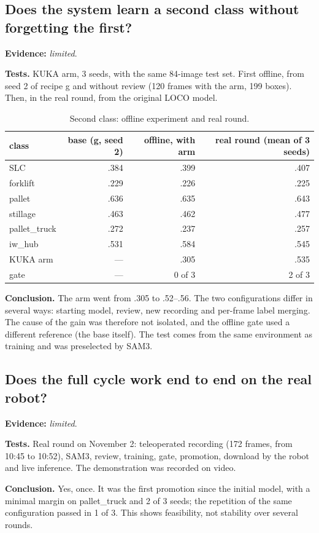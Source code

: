 \documentclass[11pt,a4paper]{article}
\newcommand{\evidence}[1]{\noindent\textbf{Evidence:} \emph{#1}.\par}
\newcommand{\tests}{\noindent\textbf{Tests.} }
\newcommand{\conclusion}{\noindent\textbf{Conclusion.} }
\begin{document}
\subsection{Does the system learn a second class without forgetting the first?}
\evidence{limited}

\tests KUKA arm, 3 seeds, with the same 84-image test set. First offline, from seed
2 of recipe g and without review (120 frames with the arm, 199 boxes). Then, in the
real round, from the original LOCO model.

\begin{table}[H]
\centering\small
\caption{Second class: offline experiment and real round.}
\begin{tabular}{lrrr}
\toprule
class & base (g, seed 2) & offline, with arm & real round (mean of 3 seeds) \\
\midrule
SLC & .384 & .399 & .407 \\
forklift & .229 & .226 & .225 \\
pallet & .636 & .635 & .643 \\
stillage & .463 & .462 & .477 \\
pallet\_truck & .272 & .237 & .257 \\
iw\_hub & .531 & .584 & .545 \\
KUKA arm & --- & .305 & .535 \\
gate & --- & 0 of 3 & 2 of 3 \\
\bottomrule
\end{tabular}
\end{table}

\conclusion The arm went from .305 to .52--.56. The two configurations differ in
several ways: starting model, review, new recording and per-frame label merging.
The cause of the gain was therefore not isolated, and the offline gate used a
different reference (the base itself). The test comes from the same environment as
training and was preselected by SAM3.

\subsection{Does the full cycle work end to end on the real robot?}
\evidence{limited}

\tests Real round on November 2: teleoperated recording (172 frames, from 10:45 to
10:52), SAM3, review, training, gate, promotion, download by the robot and live
inference. The demonstration was recorded on video.

\conclusion Yes, once. It was the first promotion since the initial model, with a
minimal margin on pallet\_truck and 2 of 3 seeds; the repetition of the same
configuration passed in 1 of 3. This shows feasibility, not stability over several
rounds.
\end{document}
